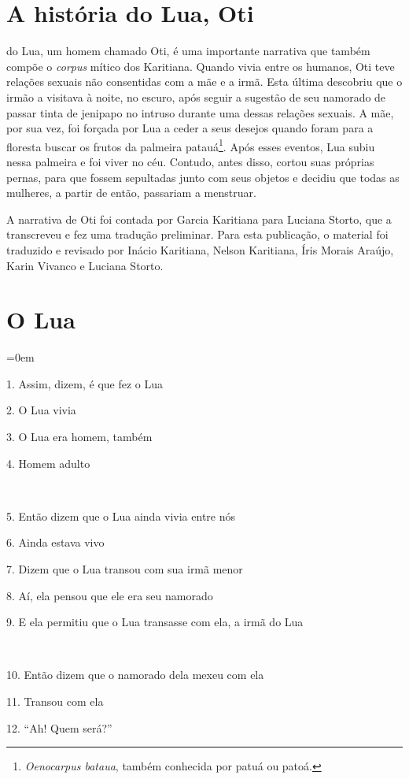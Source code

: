 \chapter{A história do Lua, Oti}

 do Lua, um homem chamado Oti, é uma importante narrativa que
também compõe o \emph{corpus} mítico dos Karitiana. Quando vivia entre
os humanos, Oti teve relações sexuais não consentidas com a mãe e a
irmã. Esta última descobriu que o irmão a visitava à noite, no escuro,
após seguir a sugestão de seu namorado de passar tinta de jenipapo no
intruso durante uma dessas relações sexuais. A mãe, por sua vez, foi
forçada por Lua a ceder a seus desejos quando foram para a floresta
buscar os frutos da palmeira patauá\footnote{\emph{Oenocarpus bataua},
  também conhecida por patuá ou patoá.}. Após esses eventos, Lua subiu
nessa palmeira e foi viver no céu. Contudo, antes disso, cortou suas
próprias pernas, para que fossem sepultadas junto com seus objetos e
decidiu que todas as mulheres, a partir de então, passariam a menstruar.

A narrativa de Oti foi contada por Garcia Karitiana para Luciana Storto,
que a transcreveu e fez uma tradução preliminar. Para esta publicação, o
material foi traduzido e revisado por Inácio Karitiana, Nelson
Karitiana, Íris Morais Araújo, Karin Vivanco e Luciana Storto.


\chapter*{O Lua}\parindent=0em

1. Assim, dizem, é que fez o Lua

2. O Lua vivia

3. O Lua era homem, também

4. Homem adulto

~

5. Então dizem que o Lua ainda vivia entre nós

6. Ainda estava vivo

7. Dizem que o Lua transou com sua irmã menor

8. Aí, ela pensou que ele era seu namorado

9. E ela permitiu que o Lua transasse com ela, a irmã do Lua

~

10. Então dizem que o namorado dela mexeu com ela

11. Transou com ela

12. ``Ah! Quem será?''

